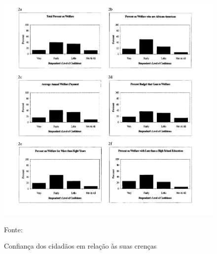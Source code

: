               \begin{figure}[H]
          \centering
          \includegraphics[scale = 0.7]{ims/factualBeliefs.png}
          \caption{Confiança dos cidadãos em relação às suas crenças}
          Fonte: 
          \label{fig6}
        \end{figure}


        


      

